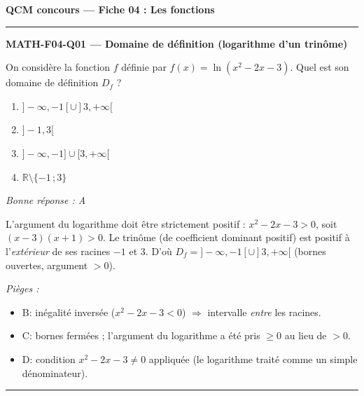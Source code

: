 \documentclass[11pt,a4paper]{article}
\newcommand{\R}{\mathbb{R}}\newcommand{\N}{\mathbb{N}}\newcommand{\Z}{\mathbb{Z}}
\begin{document}
\begin{center}\Large\textbf{QCM concours — Fiche 04 : Les fonctions}\end{center}
\vspace{6pt}\hrule\vspace{10pt}

\noindent\textbf{MATH-F04-Q01 --- Domaine de définition (logarithme d'un trinôme)}\par
On considère la fonction $f$ définie par $f(x)=\ln(x^2-2x-3)$. Quel est son domaine de définition $D_f$ ?
\begin{enumerate}[label=\Alph*)]
\item $]-\infty, -1[\cup]3, +\infty[$
\item $]-1, 3[$
\item $]-\infty, -1]\cup[3, +\infty[$
\item $\R\setminus\{-1\,;3\}$
\end{enumerate}
\textit{Bonne réponse : A}\par
L'argument du logarithme doit être strictement positif : $x^2-2x-3>0$, soit $(x-3)(x+1)>0$. Le trinôme (de coefficient dominant positif) est positif à l'\emph{extérieur} de ses racines $-1$ et $3$. D'où $D_f=]-\infty, -1[\cup]3, +\infty[$ (bornes ouvertes, argument $>0$).\par
\textit{Pièges :}
\begin{itemize}
\item B: inégalité inversée ($x^2-2x-3<0$) $\Rightarrow$ intervalle \emph{entre} les racines.
\item C: bornes fermées ; l'argument du logarithme a été pris $\geq 0$ au lieu de $>0$.
\item D: condition $x^2-2x-3\neq 0$ appliquée (le logarithme traité comme un simple dénominateur).
\end{itemize}
\vspace{8pt}\hrule\vspace{8pt}
\end{document}
